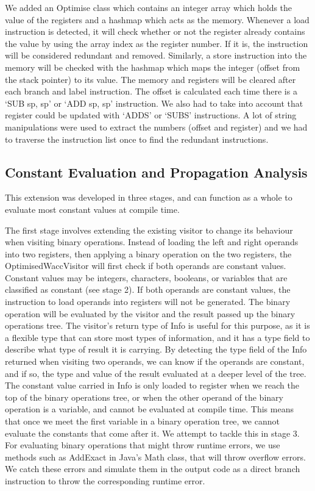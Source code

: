 \documentclass[11pt]{article}
\begin{document}
We added an Optimise class which contains an integer array which holds the value of the registers and a hashmap which acts as the memory. Whenever a load instruction is detected, it will check whether or not the register already contains the value by using the array index as the register number. If it is, the instruction will be considered redundant and removed. Similarly, a store instruction into the memory will be checked with the hashmap which maps the integer (offset from the stack pointer) to its value. The memory and registers will be cleared after each branch and label instruction. The offset is calculated each time there is a ‘SUB sp, sp’ or ‘ADD sp, sp’ instruction. We also had to take into account that register could be updated with ‘ADDS’ or ‘SUBS’ instructions. A lot of string manipulations were used to extract the numbers (offset and register) and we had to traverse the instruction list once to find the redundant instructions. 

\subsection{Constant Evaluation and Propagation Analysis}

This extension was developed in three stages, and can function as a whole to evaluate most constant values at compile time.

\medskip

The first stage involves extending the existing visitor to change its behaviour when visiting binary operations. Instead of loading the left and right operands into two registers, then applying a binary operation on the two registers, the OptimisedWaccVisitor will first check if both operands are constant values. Constant values may be integers, characters, booleans, or variables that are classified as constant (see stage 2). If both operands are constant values, the instruction to load operands into registers will not be generated. The binary operation will be evaluated by the visitor and the result passed up the binary operations tree. The visitor's return type of Info is useful for this purpose, as it is a flexible type that can store most types of information, and it has a type field to describe what type of result it is carrying. By detecting the type field of the Info returned when visiting two operands, we can know if the operands are constant, and if so, the type and value of the result evaluated at a deeper level of the tree. The constant value carried in Info is only loaded to register when we reach the top of the binary operations tree, or when the other operand of the binary operation is a variable, and cannot be evaluated at compile time. This means that once we meet the first variable in a binary operation tree, we cannot evaluate the constants that come after it. We attempt to tackle this in stage 3. For evaluating binary operations that might throw runtime errors, we use methods such as AddExact in Java's Math class, that will throw overflow errors. We catch these errors and simulate them in the output code as a direct branch instruction to throw the corresponding runtime error.
\end{document}
